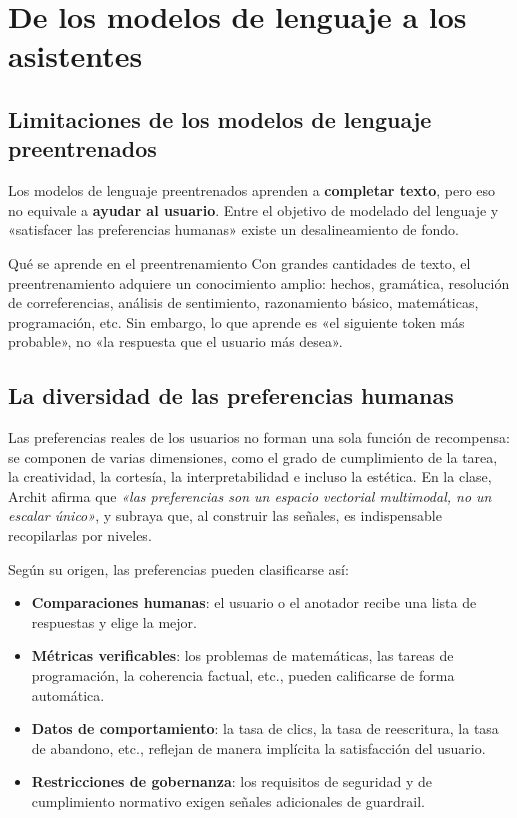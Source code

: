 \section{De los modelos de lenguaje a los asistentes}

\subsection{Limitaciones de los modelos de lenguaje preentrenados}

Los modelos de lenguaje preentrenados aprenden a \textbf{completar texto}, pero eso no equivale a \textbf{ayudar al usuario}. Entre el objetivo de modelado del lenguaje y «satisfacer las preferencias humanas» existe un desalineamiento de fondo.

\begin{knowledgebox}{Qué se aprende en el preentrenamiento}
Con grandes cantidades de texto, el preentrenamiento adquiere un conocimiento amplio: hechos, gramática, resolución de correferencias, análisis de sentimiento, razonamiento básico, matemáticas, programación, etc. Sin embargo, lo que aprende es «el siguiente token más probable», no «la respuesta que el usuario más desea».
\end{knowledgebox}

\subsection{La diversidad de las preferencias humanas}

Las preferencias reales de los usuarios no forman una sola función de recompensa: se componen de varias dimensiones, como el grado de cumplimiento de la tarea, la creatividad, la cortesía, la interpretabilidad e incluso la estética. En la clase, Archit afirma que \textit{«las preferencias son un espacio vectorial multimodal, no un escalar único»}, y subraya que, al construir las señales, es indispensable recopilarlas por niveles.

Según su origen, las preferencias pueden clasificarse así:
\begin{itemize}
    \item \textbf{Comparaciones humanas}: el usuario o el anotador recibe una lista de respuestas y elige la mejor.
    \item \textbf{Métricas verificables}: los problemas de matemáticas, las tareas de programación, la coherencia factual, etc., pueden calificarse de forma automática.
    \item \textbf{Datos de comportamiento}: la tasa de clics, la tasa de reescritura, la tasa de abandono, etc., reflejan de manera implícita la satisfacción del usuario.
    \item \textbf{Restricciones de gobernanza}: los requisitos de seguridad y de cumplimiento normativo exigen señales adicionales de guardrail.
\end{itemize}

